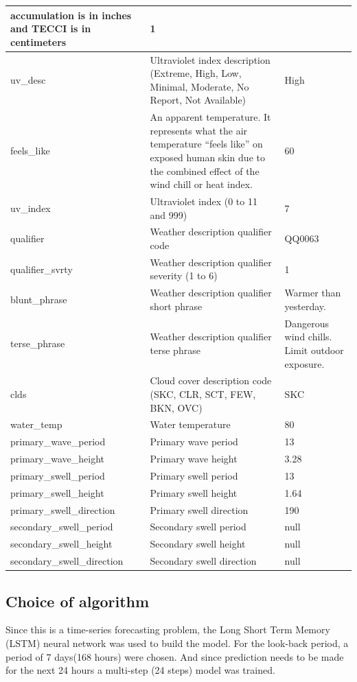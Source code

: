 \documentclass[paper=a4, fontsize=11pt, margin=1in]{scrartcl}
\numberwithin{equation}{section}		%
\numberwithin{figure}{section}			%
\numberwithin{table}{section}				%
\begin{document}
\begin{longtable}{|p{4.5cm}|p{7cm} |p{3cm}|}
accumulation is in inches and TECCI is in
centimeters & 1\\
\hline
uv\_desc & Ultraviolet index description \newline (Extreme, High, Low, Minimal, Moderate, No Report, Not Available)& High \\
\hline
feels\_like & An apparent temperature. It represents what the air temperature “feels like” on exposed human skin 
due to the combined effect of the wind chill or heat index. & 60 \\
\hline
uv\_index & Ultraviolet index \newline (0 to 11 and 999) & 7 \\
\hline
qualifier & Weather description qualifier code & QQ0063 \\
\hline
qualifier\_svrty & Weather description qualifier severity \newline (1 to 6)& 1\\
\hline
blunt\_phrase & Weather description qualifier short phrase & Warmer than yesterday.\\
\hline
terse\_phrase & Weather description qualifier terse phrase & Dangerous wind chills. Limit outdoor exposure. \\
\hline
clds & Cloud cover description code \newline (SKC, CLR, SCT, FEW, BKN, OVC)  & SKC \\
\hline
water\_temp & Water temperature  & 80\\
\hline
primary\_wave\_period & Primary wave period & 13\\
\hline
primary\_wave\_height & Primary wave height & 3.28\\
\hline
primary\_swell\_period & Primary swell period & 13\\
\hline
primary\_swell\_height & Primary swell height & 1.64\\
\hline
primary\_swell\_direction & Primary swell direction & 190\\
\hline
secondary\_swell\_period & Secondary swell period & null\\
\hline
secondary\_swell\_height & Secondary swell height & null\\
\hline
secondary\_swell\_direction & Secondary swell direction & null\\
\hline %
\end{longtable}

\subsection{\textbf{Choice of algorithm}}
Since this is a time-series forecasting problem, the Long Short Term Memory (LSTM) neural network was used to build the model. For the look-back period, a period of 7 days(168 hours) were chosen. And since prediction needs to be made for the next 24 hours a multi-step (24 steps) model was trained.\\
\end{document}

